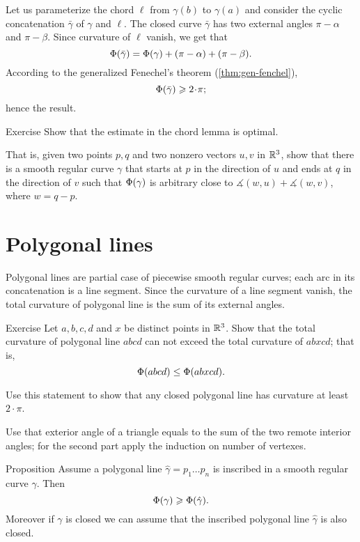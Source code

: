 Let us parameterize the chord $\ell$ from $\gamma(b)$ to $\gamma(a)$ and consider the cyclic concatenation $\bar\gamma$ of $\gamma$ and $\ell$.
The closed curve $\bar\gamma$ has two external angles $\pi-\alpha$ and $\pi-\beta$.
Since curvature of $\ell$ vanish, we get that 
\[\Phi({\bar\gamma})=\Phi({\gamma})+(\pi-\alpha)+(\pi-\beta).\]
According to the generalized Fenechel's theorem (\ref{thm:gen-fenchel}),
\[\tc{\bar\gamma}\ge 2\cdot\pi;\]
hence the result.
\qeds

\begin{thm}{Exercise}\label{ex:chord-lemma-optimal}
Show that the estimate in the chord lemma is optimal.

That is, given two points $p, q$ and two nonzero vectors $u,v$ in $\mathbb{R}^3$,
show that there is a smooth regular curve $\gamma$ that starts at $p$ in the direction of $u$ and ends at $q$ in the direction of $v$ such that 
$\Phi({\gamma})$ is arbitrary close to $\measuredangle(w,u)+\measuredangle(w,v)$, where $w=q-p$.

\end{thm}

\section*{Polygonal lines} 

Polygonal lines are partial case of piecewise smooth regular curves;
each arc in its concatenation is a line segment.
Since the curvature of a line segment vanish, the total curvature of polygonal line is the sum of its external angles.

\begin{thm}{Exercise}\label{ex:monotonic-tc}
Let $a,b,c,d$ and $x$ be distinct points in $\mathbb{R}^3$.
Show that the total curvature of polygonal line $abcd$ can not exceed the total curvature of $abxcd$; that is, 
\[\Phi({abcd}) \leq \Phi({abxcd}).\]

Use this statement to show that any closed polygonal line has curvature at least $2\cdot\pi$.
\end{thm}

Use that exterior angle of a triangle equals to the sum of the two remote interior angles;
for the second part apply the induction on number of vertexes.

\begin{thm}{Proposition}\label{prop:inscribed-total-curvature}
Assume a polygonal line $\hat\gamma=p_1\dots p_n$ is inscribed in a smooth regular curve $\gamma$.
Then 
\[\Phi({\gamma})\geqslant \Phi({\hat\gamma}).\]
Moreover if $\gamma$ is closed we can assume that the inscribed polygonal line $\hat\gamma$ is also closed.

\end{thm}

